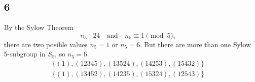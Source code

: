 \documentclass[draft]{article}
\begin{document}
		\subsection*{6}
			By the Sylow Theorem
			$$
				n_5 \mid 24 \quad \text{and} \quad n_5 \equiv 1 \pmod 5,
			$$
			there are two posible values $n_5 = 1$ or $n_5 = 6$. But there are more
			than one Sylow 5-subgroup in $S_5$, so $n_5 = 6$.
			\begin{equation*}
				\begin{split}
					\{(1),(12345),(13524),(14253),(15432)\} \\
					\{(1),(13452),(14235),(15324),(12543)\}
				\end{split}
			\end{equation*}
\end{document}
